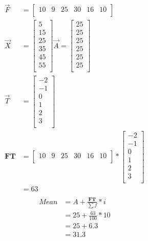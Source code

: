 \documentclass[12pt, a4paper, twocolumn]{article}
\begin{document}
\begin{align*}
\vec{F} & = 
\begin{bmatrix}
10 & 9 & 25 & 30 & 16 & 10 \\
\end{bmatrix}\\
\vec{X} & = 
\begin{bmatrix}
5 \\ 15 \\ 25 \\ 35 \\ 45 \\ 55 \\
\end{bmatrix}
\vec{A} = 
\begin{bmatrix}
25\\25\\25\\25\\25\\25\\
\end{bmatrix}\\
\vec{T} & =
\begin{bmatrix}
-2 \\ -1 \\ 0 \\ 1 \\ 2 \\ 3 \\
\end{bmatrix}\\
\textbf{FT} & =
\begin{bmatrix}
10 & 9 & 25 & 30 & 16 & 10 \\
\end{bmatrix}
*
\begin{bmatrix}
-2 \\ -1 \\ 0 \\ 1 \\ 2 \\ 3 \\
\end{bmatrix}\\
 & = 63\\
\end{align*}
\begin{align*}
Mean & = A + \frac{ \textbf{FT} }{\sum f} * i\\
     & = 25 + \frac{63}{100} * 10\\
     & = 25 + 6.3\\
     & = 31.3\\\
\end{align*}
\end{document}
